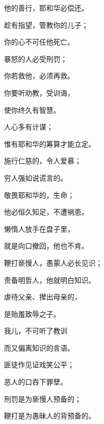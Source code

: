 {\par }{\Q 他的善行，耶和华必偿还。
\par }{\Q {}趁有指望，管教你的儿子；
\par }{\Q 你的心不可任他死亡。
\par }{\Q {}暴怒的人必受刑罚；
\par }{\Q 你若救他，必须再救。
\par }{\Q {}你要听劝教，受训诲，
\par }{\Q 使你终久有智慧。
\par }{\Q {}人心多有计谋；
\par }{\Q 惟有耶和华的筹算才能立定。
\par }{\Q {}施行仁慈的，令人爱慕；
\par }{\Q 穷人强如说谎言的。
\par }{\Q {}敬畏耶和华的，{}生命；
\par }{\Q 他必恒久知足，不遭祸患。
\par }{\Q {}懒惰人放手在盘子里，
\par }{\Q 就是向口撤回，他也不肯。
\par }{\Q {}鞭打亵慢人，愚蒙人必长见识；
\par }{\Q 责备明哲人，他就明白知识。
\par }{\Q {}虐待父亲、撵出母亲的，
\par }{\Q 是贻羞致辱之子。
\par }{\Q {}我儿，不可听了教训
\par }{\Q 而又偏离知识的言语。
\par }{\Q {}匪徒作见证戏笑公平；
\par }{\Q 恶人的口吞下罪孽。
\par }{\Q {}刑罚是为亵慢人预备的；
\par }{\Q 鞭打是为愚昧人的背预备的。

}
